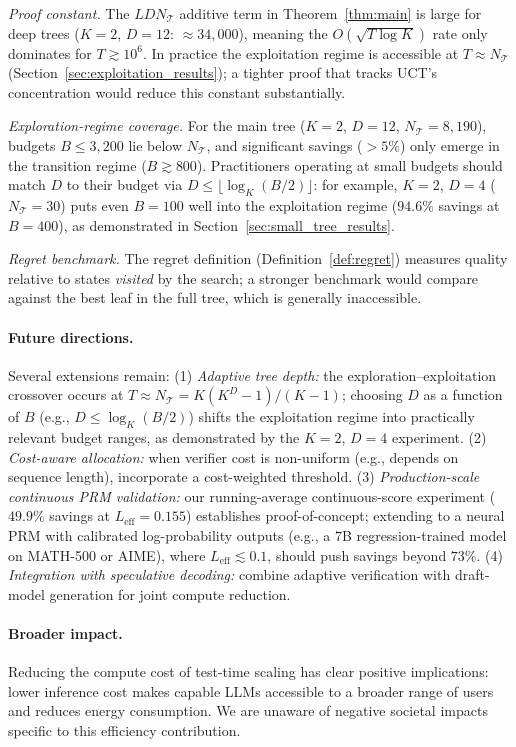 \emph{Proof constant.}
The $LDN_{\mathcal{T}}$ additive term in Theorem~\ref{thm:main} is large for deep
trees ($K{=}2$, $D{=}12$: $\approx 34{,}000$), meaning the $O(\sqrt{T\log K})$
rate only dominates for $T \gtrsim 10^6$.  In practice the exploitation regime is
accessible at $T \approx N_{\mathcal{T}}$ (Section~\ref{sec:exploitation_results});
a tighter proof that tracks UCT's concentration would reduce this constant
substantially.

\emph{Exploration-regime coverage.}
For the main tree ($K{=}2$, $D{=}12$, $N_{\mathcal{T}}{=}8{,}190$), budgets
$B \leq 3{,}200$ lie below $N_{\mathcal{T}}$, and significant savings ($>5\%$) only
emerge in the transition regime ($B \gtrsim 800$).  Practitioners operating
at small budgets should match $D$ to their budget via
$D \leq \lfloor\log_K(B/2)\rfloor$: for example, $K{=}2$, $D{=}4$
($N_{\mathcal{T}}{=}30$) puts even $B{=}100$ well into the exploitation regime
($94.6\%$ savings at $B{=}400$), as demonstrated in
Section~\ref{sec:small_tree_results}.

\emph{Regret benchmark.}
The regret definition (Definition~\ref{def:regret}) measures quality relative to
states \emph{visited} by the search; a stronger benchmark would compare against
the best leaf in the full tree, which is generally inaccessible.

\paragraph{Future directions.}
Several extensions remain:
(1) \emph{Adaptive tree depth:} the exploration--exploitation crossover occurs at
$T \approx N_{\mathcal{T}} = K(K^D-1)/(K-1)$; choosing $D$ as a function of $B$
(e.g., $D \leq \log_K(B/2)$) shifts the exploitation regime into practically
relevant budget ranges, as demonstrated by the $K{=}2$, $D{=}4$ experiment.
(2) \emph{Cost-aware allocation:} when verifier cost is non-uniform (e.g., depends on
sequence length), incorporate a cost-weighted threshold.
(3) \emph{Production-scale continuous PRM validation:} our running-average
continuous-score experiment ($49.9\%$ savings at $L_{\text{eff}}{=}0.155$)
establishes proof-of-concept; extending to a neural PRM with calibrated
log-probability outputs (e.g., a $7$B regression-trained model on MATH-500 or AIME),
where $L_{\text{eff}} \lesssim 0.1$, should push savings beyond $73\%$.
(4) \emph{Integration with speculative decoding:} combine adaptive verification with
draft-model generation for joint compute reduction.

\paragraph{Broader impact.}
Reducing the compute cost of test-time scaling has clear positive implications:
lower inference cost makes capable LLMs accessible to a broader range of users and
reduces energy consumption. We are unaware of negative societal impacts specific to
this efficiency contribution.
